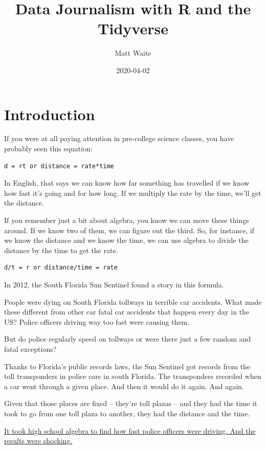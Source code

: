 \documentclass[]{book}
\title{Data Journalism with R and the Tidyverse}
\author{Matt Waite}
\date{2020-04-02}
\begin{document}
\maketitle

{
\setcounter{tocdepth}{1}
\tableofcontents
}
\hypertarget{introduction}{%
\chapter{Introduction}\label{introduction}}

If you were at all paying attention in pre-college science classes, you have probably seen this equation:

\begin{verbatim}
d = rt or distance = rate*time
\end{verbatim}

In English, that says we can know how far something has travelled if we know how fast it's going and for how long. If we multiply the rate by the time, we'll get the distance.

If you remember just a bit about algebra, you know we can move these things around. If we know two of them, we can figure out the third. So, for instance, if we know the distance and we know the time, we can use algebra to divide the distance by the time to get the rate.

\begin{verbatim}
d/t = r or distance/time = rate
\end{verbatim}

In 2012, the South Florida Sun Sentinel found a story in this formula.

People were dying on South Florida tollways in terrible car accidents. What made these different from other car fatal car accidents that happen every day in the US? Police officers driving way too fast were causing them.

But do police regularly speed on tollways or were there just a few random and fatal exceptions?

Thanks to Florida's public records laws, the Sun Sentinel got records from the toll transponders in police cars in south Florida. The transponders recorded when a car went through a given place. And then it would do it again. And again.

Given that those places are fixed -- they're toll plazas -- and they had the time it took to go from one toll plaza to another, they had the distance and the time.

\href{http://www.sun-sentinel.com/news/local/speeding-cops/fl-speeding-cops-20120211,0,3706919.story}{It took high school algebra to find how fast police officers were driving. And the results were shocking.}
\end{document}
